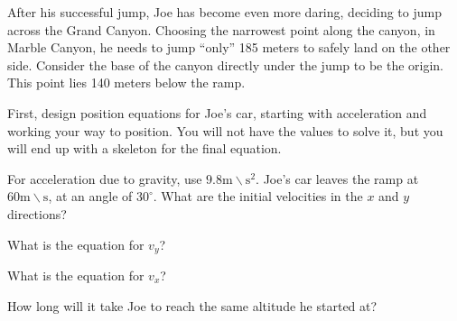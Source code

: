 \documentclass{ximera}
\begin{document}
\begin{question}
After his successful jump, Joe has become even more daring, deciding to jump across the Grand Canyon. Choosing the narrowest point along the canyon, in Marble Canyon, he needs to jump ``only'' 185 meters to safely land on the other side. Consider the base of the canyon directly under the jump to be the origin. This point lies 140 meters below the ramp.

First, design position equations for Joe's car, starting with acceleration and working your way to position. You will not have the values to solve it, but you will end up with a skeleton for the final equation.

\begin{multipleChoice}
\end{multipleChoice}

For acceleration due to gravity, use $9.8 \text{m} \backslash \text{s}^2$. Joe's car leaves the ramp at $60 \text{m}\backslash \text{s}$, at an angle of $30^\circ$. What are the initial velocities in the $x$ and $y$ directions?

\begin{multipleChoice}
\end{multipleChoice}
\begin{feedback}[correct]
What is the equation for $v_{y}$?
\begin{multipleChoice}
\end{multipleChoice}
What is the equation for $v_x$?
\begin{multipleChoice}
\end{multipleChoice}
\end{feedback}
How long will it take Joe to reach the same altitude he started at?
\begin{multipleChoice}
\end{multipleChoice}



\end{question}
\end{document}
